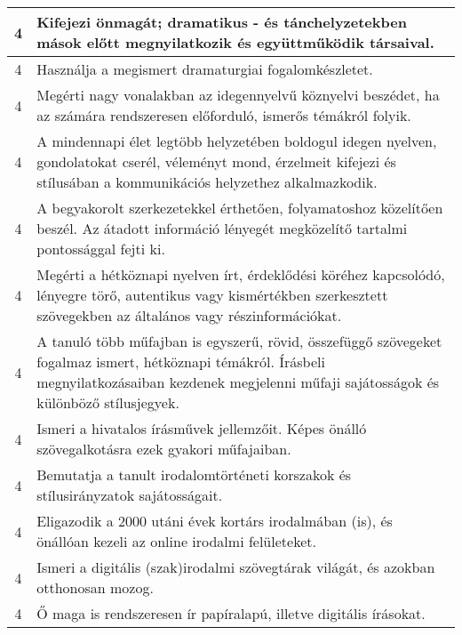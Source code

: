 \begin{longtable}{c | p{12cm} }
                                
                                          4 &  Kifejezi önmagát; dramatikus - és tánchelyzetekben mások előtt megnyilatkozik és együttműködik társaival. \\ \hline
                                          4 &  Használja a megismert dramaturgiai fogalomkészletet. \\ \hline
                                          4 &  Megérti nagy vonalakban az idegennyelvű köznyelvi beszédet, ha az számára rendszeresen előforduló, ismerős témákról folyik. \\ \hline
                                          4 &  A mindennapi élet legtöbb helyzetében boldogul idegen nyelven, gondolatokat cserél, véleményt mond, érzelmeit kifejezi és stílusában a kommunikációs helyzethez alkalmazkodik. \\ \hline
                                          4 &  A begyakorolt szerkezetekkel érthetően, folyamatoshoz közelítően beszél. Az átadott információ lényegét megközelítő tartalmi pontossággal fejti ki. \\ \hline
                                          4 &  Megérti a hétköznapi nyelven írt, érdeklődési köréhez kapcsolódó, lényegre törő, autentikus vagy kismértékben szerkesztett szövegekben az általános vagy részinformációkat. \\ \hline
                                          4 &  A tanuló több műfajban is egyszerű, rövid, összefüggő szövegeket fogalmaz ismert, hétköznapi témákról. Írásbeli megnyilatkozásaiban kezdenek megjelenni műfaji sajátosságok és különböző stílusjegyek. \\ \hline
                                          4 &  Ismeri a hivatalos írásművek jellemzőit. Képes önálló szövegalkotásra ezek gyakori műfajaiban. \\ \hline
                                          4 &  Bemutatja a tanult irodalomtörténeti korszakok és stílusirányzatok sajátosságait. \\ \hline
                                          4 &  Eligazodik a 2000 utáni évek kortárs irodalmában (is), és önállóan kezeli az online irodalmi felületeket. \\ \hline
                                          4 &  Ismeri a digitális (szak)irodalmi szövegtárak világát, és azokban otthonosan mozog. \\ \hline
                                          4 &  Ő maga is rendszeresen ír papíralapú, illetve digitális írásokat. \\ \hline

\end{longtable}
